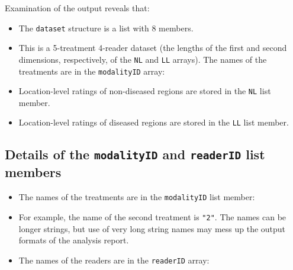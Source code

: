 \documentclass[]{book}
\newenvironment{Shaded}{\begin{snugshade}}{\end{snugshade}}
\newcommand{\CommentTok}[1]{\textcolor[rgb]{0.56,0.35,0.01}{\textit{#1}}}
\newcommand{\KeywordTok}[1]{\textcolor[rgb]{0.13,0.29,0.53}{\textbf{#1}}}
\newcommand{\NormalTok}[1]{#1}
\newcommand{\OperatorTok}[1]{\textcolor[rgb]{0.81,0.36,0.00}{\textbf{#1}}}
\providecommand{\tightlist}{%
  \setlength{\itemsep}{0pt}\setlength{\parskip}{0pt}}
\begin{document}
Examination of the output reveals that:

\begin{itemize}
\tightlist
\item
  The \texttt{dataset} structure is a list with 8 members.
\item
  This is a 5-treatment 4-reader dataset (the lengths of the first and second dimensions, respectively, of the \texttt{NL} and \texttt{LL} arrays). The names of the treatments are in the \texttt{modalityID} array:
\item
  Location-level ratings of non-diseased regions are stored in the \texttt{NL} list member.
\item
  Location-level ratings of diseased regions are stored in the \texttt{LL} list member.
\end{itemize}

\hypertarget{details-of-the-modalityid-and-readerid-list-members-1}{%
\subsection{\texorpdfstring{Details of the \texttt{modalityID} and \texttt{readerID} list members}{Details of the modalityID and readerID list members}}\label{details-of-the-modalityid-and-readerid-list-members-1}}

\begin{itemize}
\tightlist
\item
  The names of the treatments are in the \texttt{modalityID} list member:
\end{itemize}

\begin{Shaded}
\end{Shaded}

\begin{itemize}
\item
  For example, the name of the second treatment is \texttt{"2"}. The names can be longer strings, but use of very long string names may mess up the output formats of the analysis report.
\item
  The names of the readers are in the \texttt{readerID} array:
\end{itemize}

\begin{Shaded}
\end{Shaded}
\end{document}
